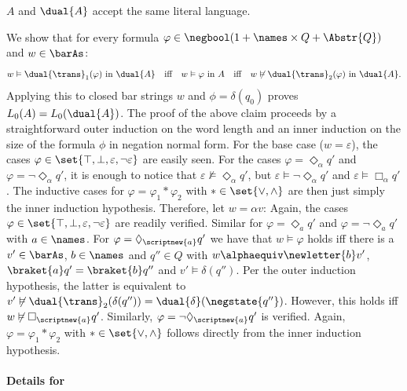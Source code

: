 \documentclass[10pt, final, conference, a4paper, twocolumn]{IEEEtran}
\begin{document}
\begin{lem}\label{lem:exprNegStates}
$A$ and $\dual{A}$ accept the same literal language.
\end{lem}
\begin{IEEEproof}
  We show that for every formula $\varphi \in \negbool(1 + \names \times Q + \Abstr{Q})$ and $w\in \barAs$:
\begin{equation}\label{eq:claim-ad} w \vDash \dual{\trans}_1(\varphi) \text{ in~$\dual{A}$} \quad\text{iff}\quad w \vDash \varphi \text{ in~$A$} \quad\text{iff}\quad w \not\vDash \dual{\trans}_2(\varphi) \text{  in~$\dual{A}$}.\end{equation}
Applying this to closed bar strings $w$ and $\phi=\delta(q_0)$ proves $L_0(A)=L_0(\dual{A})$. The proof of the above claim
  proceeds by a straightforward outer induction on the word length and an inner induction on the size of the formula $\phi$ in negation normal form.
  For the base case ($w = \varepsilon$), the cases $\varphi \in \set{\top, \bot, \varepsilon, \neg\varepsilon}$ are
  easily seen. For the cases $\varphi = \Diamond_\alpha q'$ and $\varphi = \neg\Diamond_\alpha q'$, it is enough to
  notice that $\varepsilon \not\vDash \Diamond_\alpha q'$, but $\varepsilon \vDash \neg\Diamond_\alpha q'$ and
  $\varepsilon \vDash \Box_\alpha q'$. The inductive cases for $\varphi = \varphi_1 \ast \varphi_2$ with $\ast \in \set{\vee,\wedge}$ are then just simply the inner induction hypothesis.
  Therefore, let $w = \alpha v$: Again, the cases $\varphi \in \set{\top, \bot, \varepsilon, \neg\varepsilon}$ are
  readily verified. Similar for $\varphi = \Diamond_a q'$ and $\varphi = \neg\Diamond_a q'$ with $a \in \names$.
  For $\varphi = \Diamond_{\scriptnew{a}} q'$ we have that $w \vDash \varphi$ holds iff there is a $v' \in \barAs$,
  $b \in \names$ and $q'' \in Q$ with $w \alphaequiv \newletter{b}v'$, $\braket{a}q' = \braket{b}q''$ and
  $v' \vDash \delta(q'')$. Per the outer induction hypothesis, the latter is equivalent to $v' \not\vDash \dual{\trans}_2(\delta(q'')) = \dual{\delta}(\negstate{q''})$. However, this holds iff $w \not\vDash \Box_{\scriptnew{a}} q'$.
  Similarly, $\varphi = \neg\Diamond_{\scriptnew{a}} q'$ is verified. Again, $\varphi = \varphi_1 \ast\varphi_2$ with
  $\ast \in \set{\vee,\wedge}$ follows directly from the inner induction hypothesis.
\end{IEEEproof}

\paragraph*{Details for~}
\end{document}
